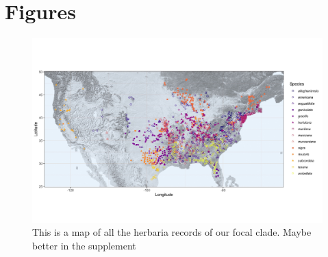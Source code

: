 \documentclass{article}[11pt]
\begin{document}




 

\newpage
\section*{Figures}
    \begin{figure}[h!]
    \centering
 \includegraphics[width=\textwidth]{..//..//Plots/Prunus-Map-raster-plasma.jpeg}
    \caption{This is a map of all the herbaria records of our focal clade. Maybe better in the supplement }
    \label{fig:mappy}
\end{figure}
\end{document}

